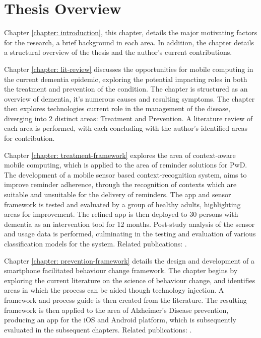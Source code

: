 \section{Thesis Overview}
Chapter \ref{chapter: introduction}, this chapter,  details the major motivating factors for the research, a brief background in each area. In addition, the chapter details a structural overview of the thesis and the author's current contributions. 

Chapter \ref{chapter: lit-review} discusses the opportunities for mobile computing in the current dementia epidemic, exploring the potential impacting roles in both the treatment and prevention of the condition. The chapter is structured as an overview of dementia, it's numerous causes and resulting symptoms. The chapter then explores technologies current role in the management of the disease, diverging into 2 distinct areas: Treatment and Prevention. A literature review of each area is performed, with each concluding with the author's identified areas for contribution.

Chapter \ref{chapter: treatment-framework} explores the area of context-aware mobile computing, which is applied to the area of reminder solutions for PwD. The development of a mobile sensor based context-recognition system, aims to improve reminder adherence, through the recognition of contexts which are suitable and unsuitable for the delivery of reminders. The app and sensor framework is tested and evaluated by a group of healthy adults, highlighting areas for improvement. The refined app is then deployed to 30 persons with dementia as an intervention tool for 12 months. Post-study analysis of the sensor and usage data is performed, culminating in the testing and evaluation of various classification models for the system. 
Related publications: \cite{Hartin2014-EMBC, Hartin2014-WAGER, Patterson2015, Cleland2014-IWAAL, Cleland2015-mHealth, Nugent2014-aaic, Behrens2015}.

Chapter \ref{chapter: prevention-framework} details the design and development of a smartphone facilitated behaviour change framework. The chapter begins by exploring the current literature on the science of behaviour change, and identifies areas in which the process can be aided though technology injection. A framework and process guide is then created from the literature. The resulting framework is then applied to the area of Alzheimer's Disease prevention, producing an app for the iOS and Android platform, which is subsequently evaluated in the subsequent chapters. 
Related publications: \cite{Hartin2015-JMIR, Hartin2014-IWAAL, Hartin2015-ICOST, Hartin2014-AAIC, Hartin2015-AAIC, Hartin2015-mHealth, Norton2015-TRCI, Norton2015-AAIC, Weyerman2015}.

